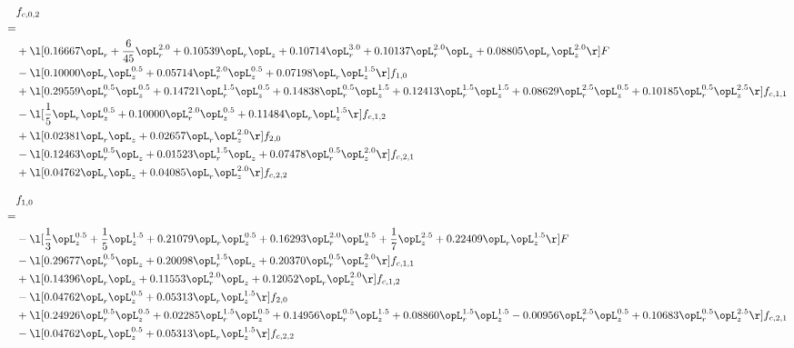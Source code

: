 \begin{alignat}{2} 
\label{eq:f_02_2} 
& f_{c,0,2} \nonumber \\ 
 = \\ 
& + \l[  0.16667 \opL_r + \frac{6}{45} \opL_r^{2.0} +  0.10539 \opL_r \opL_z +  0.10714 \opL_r^{3.0} +  0.10137 \opL_r^{2.0} \opL_z +  0.08805 \opL_r \opL_z^{2.0}  \r] F \nonumber \\ 
& - \l[  0.10000 \opL_r \opL_z^{0.5} +  0.05714 \opL_r^{2.0} \opL_z^{0.5} +  0.07198 \opL_r \opL_z^{1.5}  \r] f_{1,0} \nonumber \\ 
& + \l[  0.29559 \opL_r^{0.5} \opL_z^{0.5} +  0.14721 \opL_r^{1.5} \opL_z^{0.5} +  0.14838 \opL_r^{0.5} \opL_z^{1.5} +  0.12413 \opL_r^{1.5} \opL_z^{1.5} +  0.08629 \opL_r^{2.5} \opL_z^{0.5} +  0.10185 \opL_r^{0.5} \opL_z^{2.5}  \r] f_{c,1,1} \nonumber \\ 
& - \l[ \frac{1}{5} \opL_r \opL_z^{0.5} +  0.10000 \opL_r^{2.0} \opL_z^{0.5} +  0.11484 \opL_r \opL_z^{1.5}  \r] f_{c,1,2} \nonumber \\ 
& + \l[  0.02381 \opL_r \opL_z +  0.02657 \opL_r \opL_z^{2.0}  \r] f_{2,0} \nonumber \\ 
& - \l[  0.12463 \opL_r^{0.5} \opL_z +  0.01523 \opL_r^{1.5} \opL_z +  0.07478 \opL_r^{0.5} \opL_z^{2.0}  \r] f_{c,2,1} \nonumber \\ 
& + \l[  0.04762 \opL_r \opL_z +  0.04085 \opL_r \opL_z^{2.0}  \r] f_{c,2,2} \nonumber \\ 
\end{alignat} 


\begin{alignat}{2} 
\label{eq:f_10_2} 
& f_{1,0} \nonumber \\ 
 = \\ 
& - \l[ \frac{1}{3} \opL_z^{0.5} + \frac{1}{5} \opL_z^{1.5} +  0.21079 \opL_r \opL_z^{0.5} +  0.16293 \opL_r^{2.0} \opL_z^{0.5} + \frac{1}{7} \opL_z^{2.5} +  0.22409 \opL_r \opL_z^{1.5}  \r] F \nonumber \\ 
& - \l[  0.29677 \opL_r^{0.5} \opL_z +  0.20098 \opL_r^{1.5} \opL_z +  0.20370 \opL_r^{0.5} \opL_z^{2.0}  \r] f_{c,1,1} \nonumber \\ 
& + \l[  0.14396 \opL_r \opL_z +  0.11553 \opL_r^{2.0} \opL_z +  0.12052 \opL_r \opL_z^{2.0}  \r] f_{c,1,2} \nonumber \\ 
& - \l[  0.04762 \opL_r \opL_z^{0.5} +  0.05313 \opL_r \opL_z^{1.5}  \r] f_{2,0} \nonumber \\ 
& + \l[  0.24926 \opL_r^{0.5} \opL_z^{0.5} +  0.02285 \opL_r^{1.5} \opL_z^{0.5} +  0.14956 \opL_r^{0.5} \opL_z^{1.5} +  0.08860 \opL_r^{1.5} \opL_z^{1.5}   -0.00956 \opL_r^{2.5} \opL_z^{0.5} +  0.10683 \opL_r^{0.5} \opL_z^{2.5}  \r] f_{c,2,1} \nonumber \\ 
& - \l[  0.04762 \opL_r \opL_z^{0.5} +  0.05313 \opL_r \opL_z^{1.5}  \r] f_{c,2,2} \nonumber \\ 
\end{alignat} 


